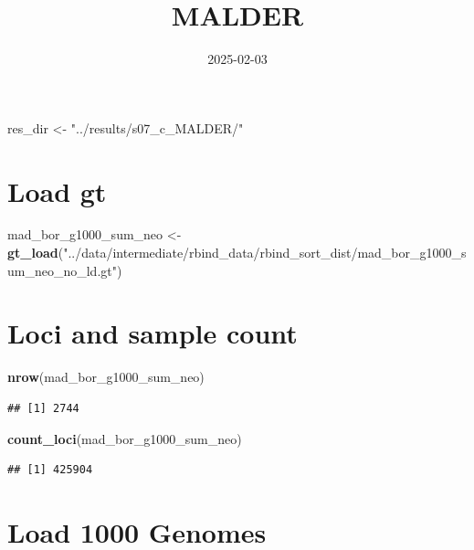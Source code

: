 \documentclass[
]{article}
\title{MALDER}
\author{}
\date{\vspace{-2.5em}2025-02-03}
\newenvironment{Shaded}{\begin{snugshade}}{\end{snugshade}}
\newcommand{\FunctionTok}[1]{\textcolor[rgb]{0.13,0.29,0.53}{\textbf{#1}}}
\newcommand{\NormalTok}[1]{#1}
\newcommand{\OtherTok}[1]{\textcolor[rgb]{0.56,0.35,0.01}{#1}}
\newcommand{\StringTok}[1]{\textcolor[rgb]{0.31,0.60,0.02}{#1}}
\begin{document}
\maketitle

\begin{Shaded}
\begin{Highlighting}[]
\NormalTok{res\_dir }\OtherTok{\textless{}{-}} \StringTok{"../results/s07\_c\_MALDER/"}
\end{Highlighting}
\end{Shaded}

\section{Load gt}\label{load-gt}

\begin{Shaded}
\begin{Highlighting}[]
\NormalTok{mad\_bor\_g1000\_sum\_neo }\OtherTok{\textless{}{-}}
  \FunctionTok{gt\_load}\NormalTok{(}\StringTok{"../data/intermediate/rbind\_data/rbind\_sort\_dist/mad\_bor\_g1000\_sum\_neo\_no\_ld.gt"}\NormalTok{)}
\end{Highlighting}
\end{Shaded}

\section{Loci and sample count}\label{loci-and-sample-count}

\begin{Shaded}
\begin{Highlighting}[]
\FunctionTok{nrow}\NormalTok{(mad\_bor\_g1000\_sum\_neo)}
\end{Highlighting}
\end{Shaded}

\begin{verbatim}
## [1] 2744
\end{verbatim}

\begin{Shaded}
\begin{Highlighting}[]
\FunctionTok{count\_loci}\NormalTok{(mad\_bor\_g1000\_sum\_neo)}
\end{Highlighting}
\end{Shaded}

\begin{verbatim}
## [1] 425904
\end{verbatim}

\section{Load 1000 Genomes}\label{load-1000-genomes}
\end{document}
